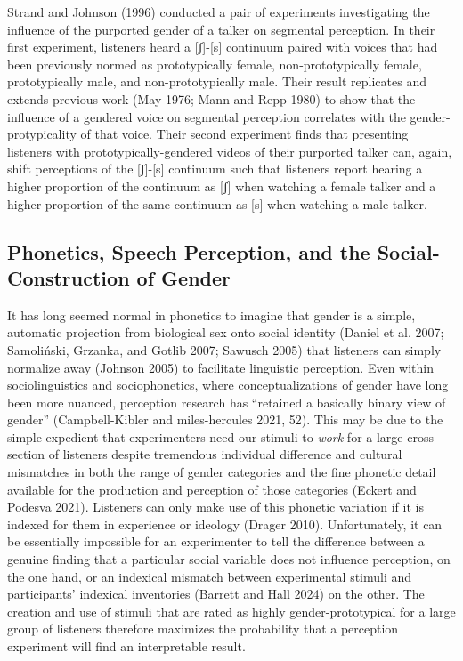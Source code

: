\documentclass[
  letterpaper,
  DIV=11,
  numbers=noendperiod]{scrartcl}
\begin{document}
Strand and Johnson (1996) conducted a pair of experiments investigating
the influence of the purported gender of a talker on segmental
perception. In their first experiment, listeners heard a {[}ʃ{]}-{[}s{]}
continuum paired with voices that had been previously normed as
prototypically female, non-prototypically female, prototypically male,
and non-prototypically male. Their result replicates and extends
previous work (May 1976; Mann and Repp 1980) to show that the influence
of a gendered voice on segmental perception correlates with the
gender-protypicality of that voice. Their second experiment finds that
presenting listeners with prototypically-gendered videos of their
purported talker can, again, shift perceptions of the {[}ʃ{]}-{[}s{]}
continuum such that listeners report hearing a higher proportion of the
continuum as {[}ʃ{]} when watching a female talker and a higher
proportion of the same continuum as {[}s{]} when watching a male talker.

\subsection{Phonetics, Speech Perception, and the Social-Construction of
Gender}\label{sec-gender}

It has long seemed normal in phonetics to imagine that gender is a
simple, automatic projection from biological sex onto social identity
(Daniel et al. 2007; Samoliński, Grzanka, and Gotlib 2007; Sawusch 2005)
that listeners can simply normalize away (Johnson 2005) to facilitate
linguistic perception. Even within sociolinguistics and sociophonetics,
where conceptualizations of gender have long been more nuanced,
perception research has ``retained a basically binary view of gender''
(Campbell-Kibler and miles-hercules 2021, 52). This may be due to the
simple expedient that experimenters need our stimuli to \emph{work} for
a large cross-section of listeners despite tremendous individual
difference and cultural mismatches in both the range of gender
categories and the fine phonetic detail available for the production and
perception of those categories (Eckert and Podesva 2021). Listeners can
only make use of this phonetic variation if it is indexed for them in
experience or ideology (Drager 2010). Unfortunately, it can be
essentially impossible for an experimenter to tell the difference
between a genuine finding that a particular social variable does not
influence perception, on the one hand, or an indexical mismatch between
experimental stimuli and participants' indexical inventories (Barrett
and Hall 2024) on the other. The creation and use of stimuli that are
rated as highly gender-prototypical for a large group of listeners
therefore maximizes the probability that a perception experiment will
find an interpretable result.
\end{document}
